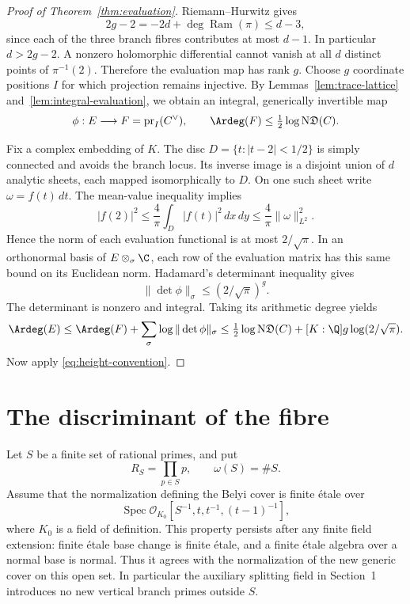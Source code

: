 \begin{proof}[Proof of Theorem~\ref{thm:evaluation}]
Riemann--Hurwitz gives
\[
 2g-2=-2d+\deg\operatorname{Ram}(\pi)\le d-3,
\]
since each of the three branch fibres contributes at most $d-1$.
In particular $d>2g-2$. A nonzero holomorphic differential cannot
vanish at all $d$ distinct points of $\pi^{-1}(2)$. Therefore the
evaluation map has rank $g$. Choose $g$ coordinate positions $I$
for which projection remains injective. By
Lemmas~\ref{lem:trace-lattice} and~\ref{lem:integral-evaluation},
we obtain an integral, generically invertible map
\[
 \phi:E\longrightarrow F=\operatorname{pr}_I(C^\vee),
 \qquad\Ardeg(F)\le\tfrac12\log\mathrm N\mathfrak D(C).
\]

Fix a complex embedding of $K$. The disc
$D=\{t:|t-2|<1/2\}$ is simply connected and avoids the branch
locus. Its inverse image is a disjoint union of $d$ analytic
sheets, each mapped isomorphically to $D$. On one such sheet write
$\omega=f(t)\,dt$. The mean-value inequality implies
\[
 |f(2)|^2\le\frac4\pi\int_D|f(t)|^2\,dx\,dy
       \le\frac4\pi\|\omega\|_{L^2}^2.
\]
Hence the norm of each evaluation functional is at most
$2/\sqrt\pi$. In an orthonormal basis of $E\otimes_\sigma\C$,
each row of the evaluation matrix has this same bound on its
Euclidean norm. Hadamard's determinant inequality gives
\[
 \|\det\phi\|_\sigma\le(2/\sqrt\pi)^g.
\]
The determinant is nonzero and integral. Taking its arithmetic
degree yields
\[
 \Ardeg(E)\le\Ardeg(F)
       +\sum_\sigma\log\|\det\phi\|_\sigma
 \le\tfrac12\log\mathrm N\mathfrak D(C)
       +[K:\Q]g\log(2/\sqrt\pi).
\]
Now apply \eqref{eq:height-convention}.
\end{proof}

\section{The discriminant of the fibre}

Let $S$ be a finite set of rational primes, and put
\[
 R_S=\prod_{p\in S}p,\qquad \omega(S)=\#S.
\]
Assume that the normalization defining the Belyi cover is finite
\'etale over
\begin{equation}\label{eq:good-open}
 \operatorname{Spec}\mathcal O_{K_0}
       [S^{-1},t,t^{-1},(t-1)^{-1}],
\end{equation}
where $K_0$ is a field of definition.
This property persists after any finite field extension:
finite \'etale base change is finite \'etale, and a finite \'etale
algebra over a normal base is normal. Thus it agrees with the
normalization of the new generic cover on this open set.
In particular the auxiliary splitting field in Section~1 introduces
no new vertical branch primes outside $S$.

